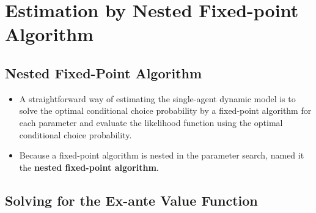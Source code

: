 \documentclass[
]{book}
\providecommand{\tightlist}{%
  \setlength{\itemsep}{0pt}\setlength{\parskip}{0pt}}
\begin{document}
\hypertarget{estimation-by-nested-fixed-point-algorithm}{%
\section{Estimation by Nested Fixed-point Algorithm}\label{estimation-by-nested-fixed-point-algorithm}}

\hypertarget{nested-fixed-point-algorithm}{%
\subsection{Nested Fixed-Point Algorithm}\label{nested-fixed-point-algorithm}}

\begin{itemize}
\tightlist
\item
  A straightforward way of estimating the single-agent dynamic model is to solve the optimal conditional choice probability by a fixed-point algorithm for each parameter and evaluate the likelihood function using the optimal conditional choice probability.
\item
  Because a fixed-point algorithm is nested in the parameter search, \citet{rustOptimalReplacementGMC1987} named it the \textbf{nested fixed-point algorithm}.
\end{itemize}

\hypertarget{solving-for-the-ex-ante-value-function}{%
\subsection{Solving for the Ex-ante Value Function}\label{solving-for-the-ex-ante-value-function}}
\end{document}
